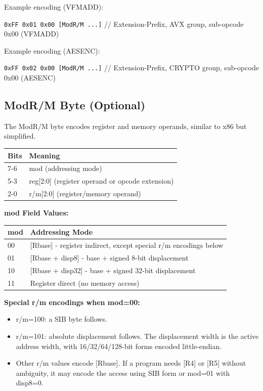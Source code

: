 \documentclass[11pt]{article}
\begin{document}
\noindent Example encoding (VFMADD):
\begin{center}
\texttt{0xFF 0x01 0x00 [ModR/M ...]} \quad // Extension-Prefix, AVX group, sub-opcode 0x00 (VFMADD)
\end{center}

\noindent Example encoding (AESENC):
\begin{center}
\texttt{0xFF 0x02 0x00 [ModR/M ...]} \quad // Extension-Prefix, CRYPTO group, sub-opcode 0x00 (AESENC)
\end{center}

\subsection{ModR/M Byte (Optional)}

The ModR/M byte encodes register and memory operands, similar to x86 but simplified.

\begin{table}[h]
\centering
\begin{tabular}{@{}ll@{}}
\toprule
\textbf{Bits} & \textbf{Meaning} \\ \midrule
7-6 & mod (addressing mode) \\
5-3 & reg[2:0] (register operand or opcode extension) \\
2-0 & r/m[2:0] (register/memory operand) \\ \bottomrule
\end{tabular}
\end{table}

\textbf{mod Field Values:}

\begin{table}[h]
\centering
\begin{tabular}{@{}ll@{}}
\toprule
\textbf{mod} & \textbf{Addressing Mode} \\ \midrule
00 & [Rbase] - register indirect, except special r/m encodings below \\
01 & [Rbase + disp8] - base + signed 8-bit displacement \\
10 & [Rbase + disp32] - base + signed 32-bit displacement \\
11 & Register direct (no memory access) \\ \bottomrule
\end{tabular}
\end{table}

\textbf{Special r/m encodings when mod=00:}

\begin{itemize}
    \item r/m=100: a SIB byte follows.
    \item r/m=101: absolute displacement follows. The displacement width is the active address width, with 16/32/64/128-bit forms encoded little-endian.
    \item Other r/m values encode [Rbase]. If a program needs [R4] or [R5] without ambiguity, it may encode the access using SIB form or mod=01 with disp8=0.
\end{itemize}
\end{document}
